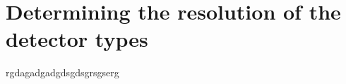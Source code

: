 \appendix

\section{Determining the resolution of the detector types}
\label{sec:ResDetermination}
rgdagadgadgdsgdsgrsgserg



